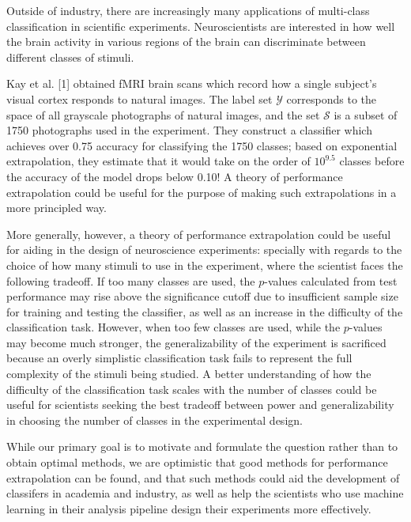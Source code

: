 \documentclass[12pt]{article}
\begin{document}
Outside of industry, there are increasingly many applications of
multi-class classification in scientific experiments.  Neuroscientists
are interested in how well the brain activity in various regions of
the brain can discriminate between different classes of stimuli.

Kay et al. [1] obtained fMRI brain scans which record how a single
subject's visual cortex responds to natural images.  The label set
$\mathcal{Y}$ corresponds to the space of all grayscale photographs of
natural images, and the set $\mathcal{S}$ is a subset of 1750
photographs used in the experiment.  They construct a classifier which
achieves over 0.75 accuracy for classifying the 1750 classes; based on
exponential extrapolation, they estimate that it would take on the
order of $10^{9.5}$ classes before the accuracy of the model drops
below 0.10!  A theory of performance extrapolation could be useful for
the purpose of making such extrapolations in a more principled way.

More generally, however, a theory of performance extrapolation could
be useful for aiding in the design of neuroscience experiments:
specially with regards to the choice of how many stimuli to use in the
experiment, where the scientist faces the following tradeoff.  If too
many classes are used, the $p$-values calculated from test performance
may rise above the significance cutoff due to insufficient sample size
for training and testing the classifier, as well as an increase in the
difficulty of the classification task.  However, when too few classes
are used, while the $p$-values may become much stronger, the
generalizability of the experiment is sacrificed because an overly
simplistic classification task fails to represent the full complexity
of the stimuli being studied.  A better understanding of how the
difficulty of the classification task scales with the number of
classes could be useful for scientists seeking the best tradeoff
between power and generalizability in choosing the number of classes
in the experimental design.

While our primary goal is to motivate and formulate the question
rather than to obtain optimal methods, we are optimistic that good
methods for performance extrapolation can be found, and that such
methods could aid the development of classifers in academia and
industry, as well as help the scientists who use machine learning in
their analysis pipeline design their experiments more effectively.
\end{document}
